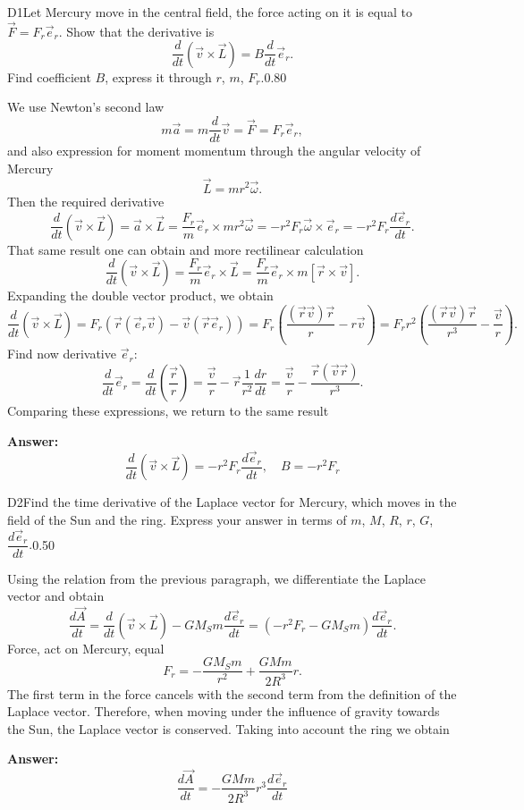 \documentclass[11pt,a4paper]{article}
\begin{document}
\begin{solcard}{D1}{Let Mercury move in the central field, the force acting on it is equal to $\vec{F}  = F_r \vec{e}_r$. Show that the derivative is $$ \frac{d}{dt} \left( \vec{v} \times \vec{L}\right) = B \frac{d}{d t} \vec{e}_r. $$Find coefficient $B$, express it through $r$, $m$, $F_r$.}{0.80}

We use Newton's second law $$ m \vec{a} = m \frac{d}{dt} \vec{v}  = \vec{F} = F_r \vec{e}_r, $$and also expression for moment momentum through the angular velocity of Mercury $$ \vec{L}  = m r^2 \vec{\omega}. $$Then the required derivative $$ \frac{d}{dt} \left( \vec{v} \times \vec{L}\right) = \vec{a} \times \vec{L} = \frac{F_r}{m} \vec{e}_r \times m r^2 \vec{\omega}= - r^2F_r \vec{\omega} \times \vec{e}_r = - r^2 F_r \frac{d \vec{e}_r}{dt}. $$That same result one can obtain and more rectilinear calculation $$ \frac{d}{dt} \left( \vec{v} \times \vec{L}\right) = \frac{F_r}{m} \vec{e}_r \times \vec{L}  = \frac{F_r}{m} \vec{e}_r \times m \left[\vec{r} \times \vec{v} \right]. $$Expanding the double vector product, we obtain $$ \frac{d}{dt} \left( \vec{v} \times \vec{L}\right) = F_r \left(\vec{r} (\vec{e}_r \vec{v}) - \vec{v} (\vec{r} \vec{e}_r) \right)= F_r \left( \frac{(\vec{r} \vec{v}) \vec{r}}{r} - r \vec{v}\right) = F_r r^2\left( \frac{(\vec{r} \vec{v}) \vec{r}}{r^3} - \frac{\vec{v}}{r}\right) . $$Find now derivative $\vec{e}_r$: $$ \frac{d}{dt} \vec{e}_r = \frac{d}{dt} \left( \frac{\vec{r}}{r}\right) = \frac{\vec{v}}{r} - \vec{r} \frac{1}{r^2} \frac{d r}{dt} = \frac{\vec{v}}{r} - \frac{\vec{r} (\vec{v} \vec{r})}{r^3}. $$Comparing these expressions, we return to the same result

\par\smallskip\noindent\textbf{Answer:} $$ \frac{d}{dt} \left( \vec{v} \times \vec{L}\right)  = - r^2 F_r \frac{d \vec{e}_r}{dt}, \quad B = - r^2 F_r $$
\end{solcard}

\begin{solcard}{D2}{Find the time derivative of the Laplace vector for Mercury, which moves in the field of the Sun and the ring. Express your answer in terms of $m$, $M$, $R$, $r$, $G$, $\dfrac{d \vec{e}_r}{dt}$.}{0.50}

Using the relation from the previous paragraph, we differentiate the Laplace vector and obtain $$ \frac{d \vec{A}}{dt} = \frac{d}{dt} \left( \vec{v} \times \vec{L}\right) - G M_S m \frac{d \vec{e}_r}{dt} = \left( -r^2 F_r - G M_S m\right) \frac{d \vec{e}_r}{dt}. $$Force, act on Mercury, equal $$ F_r = - \frac{GM_S m}{r^2 } + \frac{GMm}{2 R^3} r. $$The first term in the force cancels with the second term from the definition of the Laplace vector. Therefore, when moving under the influence of gravity towards the Sun, the Laplace vector is conserved. Taking into account the ring we obtain

\par\smallskip\noindent\textbf{Answer:} $$ \frac{d \vec{A}}{dt} = - \frac{GMm}{2 R^3} r^3\frac{d \vec{e}_r}{dt} $$
\end{solcard}
\end{document}
